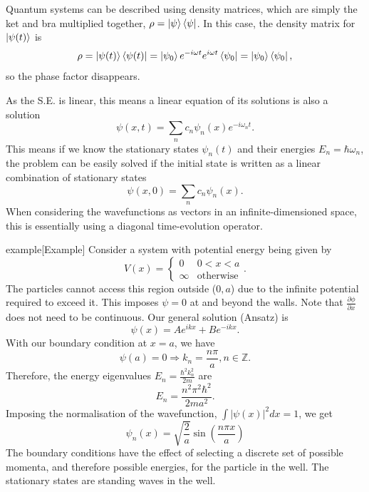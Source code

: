 \documentclass{article}
\begin{document}
Quantum systems can be described using density matrices, which are simply the ket and bra multiplied together, $\rho =\ket{\psi }\bra{\psi }$. In this case, the density matrix for $\ket{\psi (t)}$ is
\[
    \rho =\ket{\psi (t)}\bra{\psi (t)}=\ket{\psi _0}e^{-i\omega t}e^{i\omega t}\bra{\psi _0}=\ket{\psi _0}\bra{\psi _0},
\]
so the phase factor disappears.

As the S.E. is linear, this means a linear equation of its solutions is also a solution
\[
    \psi (x,t)=\sum_{n}c_n\psi _n(x)e^{-i\omega _nt}.
\]
This means if we know the stationary states $\psi _n(t)$ and their energies $E_n=\hbar\omega _n$, the problem can be easily solved if the initial state is written as a linear combination of stationary states
\[
    \psi (x,0)=\sum_{n}c_n\psi _n(x).
\]
When considering the wavefunctions as vectors in an infinite-dimensioned space, this is essentially using a diagonal time-evolution operator.

\begin{callout}{example}[Example]
\label{example:s4-e1}
Consider a system with potential energy being given by
\[
    V(x)=\begin{cases}
        0 & 0 < x < a \\
        \infty & \text{otherwise}
    \end{cases}.
\]
The particles cannot access this region outside ($0,a$) due to the infinite potential required to exceed it. This imposes $\psi =0$ at and beyond the walls. Note that $\frac{\partial \phi }{\partial x}$ does not need to be continuous. Our general solution (Ansatz) is
\[
    \psi (x)=Ae^{ikx}+Be^{-ikx}.
\]
With our boundary condition at $x=a$, we have
\[
    \psi (a)=0\Rightarrow k_n=\frac{n\pi }{a}, n \in \mathbb{Z}.
\]
Therefore, the energy eigenvalues $E_n=\frac{\hbar^2k_n^2}{2m}$ are
\[
    E_n=\frac{n^2\pi^2 \hbar^2}{2ma^2}.
\]
Imposing the normalisation of the wavefunction, $\int \left| \psi (x) \right|^2dx=1$, we get
\[
    \boxed{\psi _n(x)=\sqrt{\frac{2}{a}}\sin \left( \frac{n\pi x}{a} \right)}
\]
The boundary conditions have the effect of selecting a discrete set of possible momenta, and therefore possible energies, for the particle in the well. The stationary states are standing waves in the well.
\end{callout}
\end{document}
